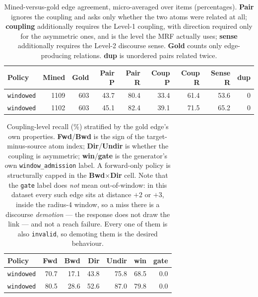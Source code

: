 \documentclass[11pt]{article}
\begin{document}
\begin{table}[htbp]
\centering
\small
\caption{Mined-versus-gold edge agreement, micro-averaged over items (percentages). \textbf{Pair} ignores the coupling and asks only whether the two atoms were related at all; \textbf{coupling} additionally requires the Level-1 coupling, with direction required only for the asymmetric ones, and is the level the MRF actually uses; \textbf{sense} additionally requires the Level-2 discourse sense. \textbf{Gold} counts only edge-producing relations. \textbf{dup} is unordered pairs related twice.}
\label{tab:mining-pr}
\begin{tabular}{lrrrrrrrr}
\toprule
Policy & Mined & Gold & Pair P & Pair R & Coup P & Coup R & Sense R & dup \\
\midrule
\texttt{windowed} & 1109 & 603 & 43.7 & 80.4 & 33.4 & 61.4 & 53.6 & 0 \\
\texttt{windowed} & 1102 & 603 & 45.1 & 82.4 & 39.1 & 71.5 & 65.2 & 0 \\
\bottomrule
\end{tabular}
\end{table}

\begin{table}[htbp]
\centering
\small
\caption{Coupling-level recall (\%) stratified by the gold edge's own properties. \textbf{Fwd}/\textbf{Bwd} is the sign of the target-minus-source atom index; \textbf{Dir}/\textbf{Undir} is whether the coupling is asymmetric; \textbf{win}/\textbf{gate} is the generator's own \texttt{window\_admission} label. A forward-only policy is structurally capped in the \textbf{Bwd}$\times$\textbf{Dir} cell. Note that the \texttt{gate} label does \emph{not} mean out-of-window: in this dataset every such edge sits at distance $+2$ or $+3$, inside the radius-4 window, so a miss there is a discourse \emph{demotion} --- the response does not draw the link --- and not a reach failure. Every one of them is also \texttt{invalid}, so demoting them is the desired behaviour.}
\label{tab:mining-recall-strat}
\begin{tabular}{lrrrrrr}
\toprule
Policy & Fwd & Bwd & Dir & Undir & win & gate \\
\midrule
\texttt{windowed} & 70.7 & 17.1 & 43.8 & 75.8 & 68.5 & 0.0 \\
\texttt{windowed} & 80.5 & 28.6 & 52.6 & 87.0 & 79.8 & 0.0 \\
\bottomrule
\end{tabular}
\end{table}
\end{document}
